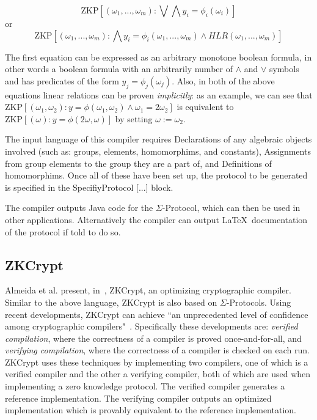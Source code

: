\documentclass{sig-alternate}
\begin{document}
		\begin{equation*}
		\text{ZKP}[(\omega_{1},...,\omega_{m}):\bigvee\bigwedge y_{i} = \phi_{i}(\omega_{i})]
		\end{equation*}
		or
		\begin{equation*}
		\text{ZKP}[(\omega_{1},...,\omega_{m}):\bigwedge y_{i} = \phi_{i}(\omega_{1},...,\omega_{m})\land HLR(\omega_{1},...,\omega_{m})]
		\end{equation*}
		
		The first equation can be expressed
		as an arbitrary monotone boolean formula, in other words a boolean formula
		with an arbitrarily number of $\land$ and $\lor$ symbols and has predicates of
		the form $y_{j} = \phi_{j}(\omega_{j}).$ Also, in both of the above equations
		linear relations can be proven \textit{implicitly}: as an example, we can
		see that $\text{ZKP}[(\omega_{1},\omega_{2}):y = \phi(\omega_{1},\omega_{2}) \land \omega_{1} = 2\omega_{2}]$
		is equivalent to $\text{ZKP}[(\omega):y = \phi(2\omega,\omega)]$ by setting $\omega:=\omega_{2}$.
		
		The input language of this compiler requires Declarations of any
		algebraic objects involved (such as: groups, elements, homomorphims, and
		constants), Assignments from group elements to the group
		they are a part of, and Definitions of homomorphims. Once all of these
		have been set up, the protocol to be generated is specified in the
		SpecifiyProtocol [...] block.
		
		The compiler outputs Java code for the $\Sigma$-Protocol, which
		can then be used in other applications. Alternatively the compiler
		can output \LaTeX~documentation of the protocol if told to do so.
		
	\subsection{ZKCrypt}
		Almeida et al. present, in~\cite{ZKCrypt:2012}, ZKCrypt, an optimizing cryptographic
		compiler. Similar to the above language, ZKCrypt is also based on $\Sigma$-Protocols.
		Using recent developments, ZKCrypt can achieve ``an unprecedented level of confidence
		among cryptographic compilers"~\cite{ZKCrypt:2012}. Specifically these developments are:
		\textit{verified compilation}, where the correctness of a compiler is proved once-and-for-all,
		and \textit{verifying compilation}, where the correctness of a compiler is checked on
		each run. ZKCrypt uses these techniques by implementing two compilers, one of which
		is a verified compiler and the other a verifying compiler, both of which are used when
		implementing a zero knowledge protocol. The verified compiler generates
		a reference implementation. The verifying compiler outputs an optimized implementation
		which is provably equivalent to the reference implementation. 
		
\end{document}
